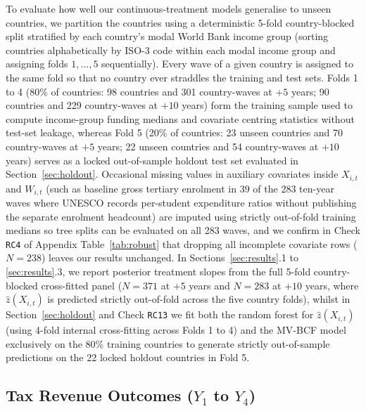 \documentclass[11pt,a4paper]{article}
\begin{document}
To evaluate how well our continuous-treatment models generalise to unseen countries, we partition the countries using a deterministic 5-fold country-blocked split stratified by each country's modal World Bank income group (sorting countries alphabetically by ISO-3 code within each modal income group and assigning folds $1, \dots, 5$ sequentially). Every wave of a given country is assigned to the same fold so that no country ever straddles the training and test sets. Folds 1 to 4 (80\% of countries: 98 countries and 301 country-waves at $+5$ years; 90 countries and 229 country-waves at $+10$ years) form the training sample used to compute income-group funding medians and covariate centring statistics without test-set leakage, whereas Fold 5 (20\% of countries: 23 unseen countries and 70 country-waves at $+5$ years; 22 unseen countries and 54 country-waves at $+10$ years) serves as a locked out-of-sample holdout test set evaluated in Section~\ref{sec:holdout}. Occasional missing values in auxiliary covariates inside $X_{i,t}$ and $W_{i,t}$ (such as baseline gross tertiary enrolment in 39 of the 283 ten-year waves where UNESCO records per-student expenditure ratios without publishing the separate enrolment headcount) are imputed using strictly out-of-fold training medians so tree splits can be evaluated on all 283 waves, and we confirm in Check \texttt{RC4} of Appendix Table~\ref{tab:robust} that dropping all incomplete covariate rows ($N = 238$) leaves our results unchanged. In Sections~\ref{sec:results}.1 to \ref{sec:results}.3, we report posterior treatment slopes from the full 5-fold country-blocked cross-fitted panel ($N = 371$ at $+5$ years and $N = 283$ at $+10$ years, where $\hat{z}(X_{i,t})$ is predicted strictly out-of-fold across the five country folds), whilst in Section~\ref{sec:holdout} and Check \texttt{RC13} we fit both the random forest for $\hat{z}(X_{i,t})$ (using 4-fold internal cross-fitting across Folds 1 to 4) and the MV-BCF model exclusively on the 80\% training countries to generate strictly out-of-sample predictions on the 22 locked holdout countries in Fold 5.

\subsection{Tax Revenue Outcomes (\texorpdfstring{$Y_1$ to $Y_4$}{Y1 to Y4})}
\end{document}
